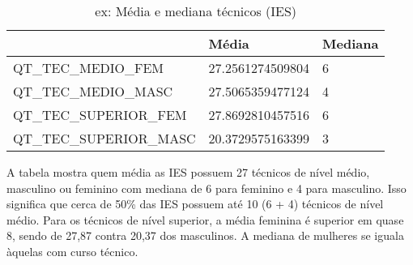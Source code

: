 \documentclass[12pt,]{style/krantz}
\makeatletter
\newenvironment{Shaded}{\begin{snugshade}}{\end{snugshade}}
\newcommand{\KeywordTok}[1]{\textcolor[rgb]{0.13,0.29,0.53}{\textbf{#1}}}
\newcommand{\DataTypeTok}[1]{\textcolor[rgb]{0.13,0.29,0.53}{#1}}
\newcommand{\DecValTok}[1]{\textcolor[rgb]{0.00,0.00,0.81}{#1}}
\newcommand{\StringTok}[1]{\textcolor[rgb]{0.31,0.60,0.02}{#1}}
\newcommand{\OtherTok}[1]{\textcolor[rgb]{0.56,0.35,0.01}{#1}}
\newcommand{\ControlFlowTok}[1]{\textcolor[rgb]{0.13,0.29,0.53}{\textbf{#1}}}
\newcommand{\OperatorTok}[1]{\textcolor[rgb]{0.81,0.36,0.00}{\textbf{#1}}}
\newcommand{\NormalTok}[1]{#1}
\newenvironment{kframe}{%
\medskip{}
\setlength{\fboxsep}{.8em}
 \def\at@end@of@kframe{}%
 \ifinner\ifhmode%
  \def\at@end@of@kframe{\end{minipage}}%
  \begin{minipage}{\columnwidth}%
 \fi\fi%
 \def\FrameCommand##1{\hskip\@totalleftmargin \hskip-\fboxsep
 \colorbox{shadecolor}{##1}\hskip-\fboxsep
     \hskip-\linewidth \hskip-\@totalleftmargin \hskip\columnwidth}%
 \MakeFramed {\advance\hsize-\width
   \@totalleftmargin\z@ \linewidth\hsize
   \@setminipage}}%
 {\par\unskip\endMakeFramed%
 \at@end@of@kframe}
\renewenvironment{Shaded}{\begin{kframe}}{\end{kframe}}
\theoremstyle{definition}
\theoremstyle{definition}
\theoremstyle{definition}
\theoremstyle{remark}
\makeatother
\begin{document}
\begin{Shaded}
\end{Shaded}

\begin{table}[!h]

\caption{\label{tab:unnamed-chunk-60}ex: Média e mediana técnicos (IES)}
\centering
\begin{tabular}{lll}
\toprule
  & Média & Mediana\\
\midrule
QT\_TEC\_MEDIO\_FEM & 27.2561274509804 & 6\\
QT\_TEC\_MEDIO\_MASC & 27.5065359477124 & 4\\
QT\_TEC\_SUPERIOR\_FEM & 27.8692810457516 & 6\\
QT\_TEC\_SUPERIOR\_MASC & 20.3729575163399 & 3\\
\bottomrule
\end{tabular}
\end{table}

A tabela mostra quem média as IES possuem 27 técnicos de nível médio,
masculino ou feminino com mediana de 6 para feminino e 4 para masculino.
Isso significa que cerca de 50\% das IES possuem até 10 (6 + 4) técnicos
de nível médio. Para os técnicos de nível superior, a média feminina é
superior em quase 8, sendo de 27,87 contra 20,37 dos masculinos. A
mediana de mulheres se iguala àquelas com curso técnico.
\end{document}
